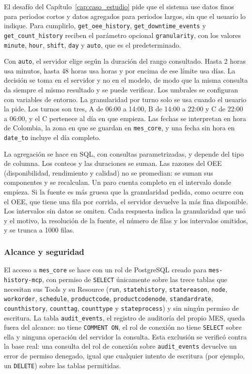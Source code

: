 El desafío  del Capítulo~\ref{cap:caso_estudio} pide que el sistema use datos finos
para periodos cortos y datos agregados para periodos largos, sin que el usuario lo
indique. Para cumplirlo, \texttt{get\_oee\_history}, \texttt{get\_downtime\_events} y
\texttt{get\_count\_history} reciben el parámetro opcional \texttt{granularity}, con los
valores \texttt{minute}, \texttt{hour}, \texttt{shift}, \texttt{day} y \texttt{auto}, que
es el predeterminado.

Con \texttt{auto}, el servidor elige según la duración del rango consultado. Hasta 2
horas usa minutos, hasta 48 horas usa horas y por encima de ese límite usa días. La
decisión se toma en el servidor y no en el modelo, de modo que la misma consulta da
siempre el mismo resultado y se puede verificar. Los umbrales se configuran con variables
de entorno. La granularidad por turno solo se usa cuando el usuario la pide. Los turnos
son tres, A de 06:00 a 14:00, B de 14:00 a 22:00 y C de 22:00 a 06:00, y el C pertenece
al día en que empieza. Las fechas se interpretan en hora de Colombia, la zona en que se
guardan en \texttt{mes\_core}, y una fecha sin hora en \texttt{date\_to} incluye el día
completo.

La agregación se hace en SQL, con consultas parametrizadas, y depende del tipo de
columna. Los conteos y las duraciones se suman. Las razones del OEE (disponibilidad,
rendimiento y calidad) no se promedian: se suman sus componentes y se recalculan. Un paro
cuenta completo en el intervalo donde empieza. Si la fuente es más gruesa que la
granularidad pedida, como ocurre con el OEE, que tiene una fila por corrida, el servidor
devuelve la más fina disponible. Los intervalos sin datos se omiten. Cada respuesta indica
la granularidad que usó y el motivo, la resolución de la fuente, el número de filas y
los intervalos omitidos, y se trunca a 1000 filas.

\subsubsection{Alcance y seguridad}
\label{alcanceseguridadhistorico}

El acceso a \texttt{mes\_core} se hace con un rol de PostgreSQL creado para \texttt{mes-history-mcp}, con permiso de \texttt{SELECT} únicamente sobre las trece tablas que
necesitan sus Tools y su Resource (\texttt{run}, \texttt{statehistory}, \texttt{statereason},
\texttt{node}, \texttt{workorder}, \texttt{schedule}, \texttt{productcode},
\texttt{productcodenode}, \texttt{standardrate}, \texttt{counthistory}, \texttt{counttag},
\texttt{counttype} y \texttt{stateprocess}) y sin ningún permiso de escritura. La tabla
\texttt{audit\_events}, el registro de auditoría del propio MES, queda fuera del alcance: no
tiene \texttt{COMMENT ON}, el rol de conexión no tiene \texttt{SELECT} sobre ella y ninguna
operación del servidor la consulta. Esta exclusión se verificó contra la base real: una
consulta del rol de conexión sobre \texttt{audit\_events} devuelve un error de permiso
denegado, igual que cualquier intento de escritura (por ejemplo, un \texttt{DELETE}) sobre las
tablas permitidas.

